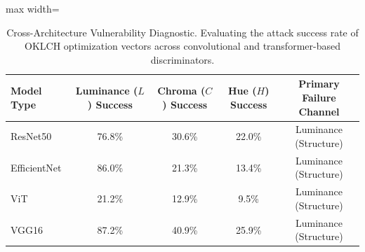 \begin{table}[htbp]
\centering
\small
\caption{Cross-Architecture Vulnerability Diagnostic. Evaluating the attack success rate of OKLCH optimization vectors across convolutional and transformer-based discriminators.}
\label{tab:cross_model}
\begin{adjustbox}{max width=\linewidth}
\begin{tabular}{@{}lcccc@{}}
\toprule
\textbf{Model Type} & \textbf{Luminance ($L$) Success} & \textbf{Chroma ($C$) Success} & \textbf{Hue ($H$) Success} & \textbf{Primary Failure Channel} \\ \midrule
ResNet50 & 76.8\% & 30.6\% & 22.0\% & Luminance (Structure) \\
EfficientNet & 86.0\% & 21.3\% & 13.4\% & Luminance (Structure) \\
ViT & 21.2\% & 12.9\% & 9.5\% & Luminance (Structure) \\
VGG16 & 87.2\% & 40.9\% & 25.9\% & Luminance (Structure) \\
\bottomrule
\end{tabular}
\end{adjustbox}
\end{table}
